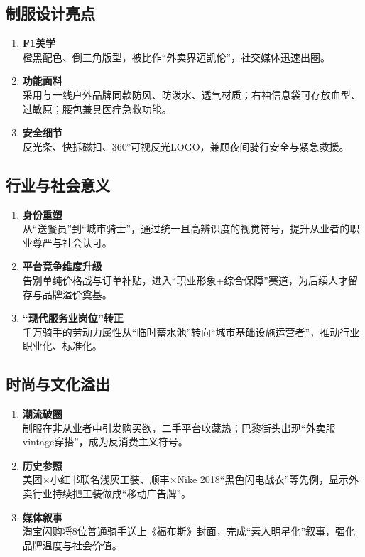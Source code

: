 \subsection{制服设计亮点}
\begin{enumerate}[leftmargin=*, nosep]
    \item \textbf{F1美学}  \\
    橙黑配色、倒三角版型，被比作“外卖界迈凯伦”，社交媒体迅速出圈。
    \item \textbf{功能面料}  \\
    采用与一线户外品牌同款防风、防泼水、透气材质；右袖信息袋可存放血型、过敏原；腰包兼具医疗急救功能。
    \item \textbf{安全细节}  \\
    反光条、快拆磁扣、360°可视反光LOGO，兼顾夜间骑行安全与紧急救援。
\end{enumerate}

\subsection{行业与社会意义}
\begin{enumerate}[leftmargin=*, nosep]
    \item \textbf{身份重塑}  \\
    从“送餐员”到“城市骑士”，通过统一且高辨识度的视觉符号，提升从业者的职业尊严与社会认可。
    \item \textbf{平台竞争维度升级}  \\
    告别单纯价格战与订单补贴，进入“职业形象+综合保障”赛道，为后续人才留存与品牌溢价奠基。
    \item \textbf{“现代服务业岗位”转正}  \\
    千万骑手的劳动力属性从“临时蓄水池”转向“城市基础设施运营者”，推动行业职业化、标准化。
\end{enumerate}

\subsection{时尚与文化溢出}
\begin{enumerate}[leftmargin=*, nosep]
    \item \textbf{潮流破圈}  \\
    制服在非从业者中引发购买欲，二手平台收藏热；巴黎街头出现“外卖服vintage穿搭”，成为反消费主义符号。  
    \item \textbf{历史参照}  \\
    美团×小红书联名浅灰工装、顺丰×Nike 2018“黑色闪电战衣”等先例，显示外卖行业持续把工装做成“移动广告牌”。
    \item \textbf{媒体叙事}  \\
    {\color{red}淘宝闪购将8位普通骑手送上《福布斯》封面，完成“素人明星化”叙事，强化品牌温度与社会价值}。
\end{enumerate}

